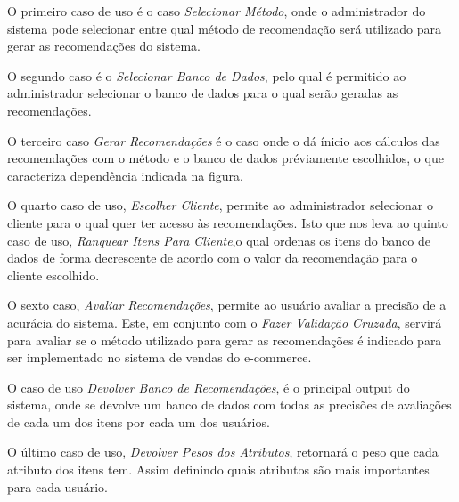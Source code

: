 O primeiro caso de uso é o caso \textit{Selecionar Método}, onde o administrador do sistema pode selecionar entre qual método de recomendação será utilizado para gerar as recomendações do sistema.

O segundo caso é o \textit{Selecionar Banco de Dados}, pelo qual é permitido ao administrador selecionar o banco de dados para o qual serão geradas as recomendações.

O terceiro caso \textit{Gerar Recomendações} é o caso onde o dá ínicio aos cálculos das recomendações com o método e o banco de dados préviamente escolhidos, o que caracteriza dependência indicada na figura.

O quarto caso de uso, \textit{Escolher Cliente}, permite ao administrador selecionar o cliente para o qual quer ter acesso às recomendações. Isto que nos leva ao quinto caso de uso, \textit{Ranquear Itens Para Cliente},o qual ordenas os itens do banco de dados de forma decrescente de acordo com o valor da recomendação para o cliente escolhido.

 O sexto caso, \textit{Avaliar Recomendações}, permite ao usuário avaliar a precisão de a acurácia do sistema. Este, em conjunto com o \textit{Fazer Validação Cruzada}, servirá para avaliar se o método utilizado para gerar as recomendações é indicado para ser implementado no sistema de vendas do e-commerce.

 O caso de uso \textit{Devolver Banco de Recomendações}, é o principal output do sistema, onde se devolve um banco de dados com todas as precisões de avaliações de cada um dos itens por cada um dos usuários.

 O último caso de uso, \textit{Devolver Pesos dos Atributos}, retornará o peso que cada atributo dos itens tem. Assim definindo quais atributos são mais importantes para cada usuário.